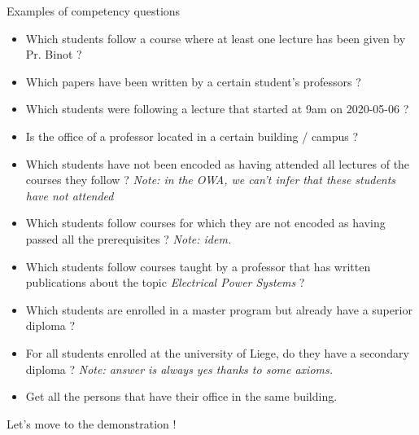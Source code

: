 \documentclass[12pt]{beamer}
\begin{document}
\begin{frame}[allowframebreaks]{Examples of competency questions}
    \footnotesize{
        \begin{itemize}
            \item Which students follow a course where at least one lecture has been given by Pr. Binot ?
            \item Which papers have been written by a certain student's professors ?
            \item Which students were following a lecture that started at 9am on 2020-05-06 ?
            \item Is the office of a professor located in a certain building / campus ?
            \item Which students have not been encoded as having attended all lectures of the courses they follow ? \emph{Note: in the OWA, we can't infer that these students have \alert{not} attended}
            
            \item Which students follow courses for which they are not encoded as having passed all the prerequisites ? \emph{Note: idem.}
            
            \item Which students follow courses taught by a professor that has written publications about the topic \emph{Electrical Power Systems} ?
            \item Which students are enrolled in a master program but already have a superior diploma ?
            
            \item For all students enrolled at the university of Liege, do they have a secondary diploma ? \emph{Note: answer is always yes thanks to some axioms.}
            
            \item Get all the persons that have their office in the same building. 
        \end{itemize}
    }
\end{frame}

\begin{frame}[standout]
  Let's move to the demonstration !
\end{frame}
\end{document}
